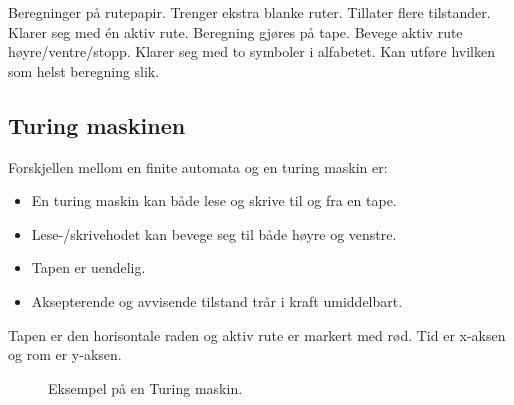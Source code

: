 \documentclass[11pt,a4paper]{article}
\begin{document}
Beregninger på rutepapir. Trenger ekstra blanke ruter. Tillater flere tilstander. Klarer seg med én aktiv rute. Beregning gjøres på tape. Bevege aktiv rute høyre/ventre/stopp. Klarer seg med to symboler i alfabetet. Kan utføre hvilken som helst beregning slik.

\subsection{Turing maskinen}
Forskjellen mellom en finite automata og en turing maskin er:
\begin{itemize}
\item{En turing maskin kan både lese og skrive til og fra en tape.}
\item{Lese-/skrivehodet kan bevege seg til både høyre og venstre.}
\item{Tapen er uendelig.}
\item{Aksepterende og avvisende tilstand trår i kraft umiddelbart.}
\end{itemize}

\begin{center}
\end{center}

Tapen er den horisontale raden og aktiv rute er markert med rød. Tid er x-aksen og rom er y-aksen.


\begin{figure}[h!]
\centering
{}
\caption{Eksempel på en Turing maskin.}
\end{figure}
\end{document}
